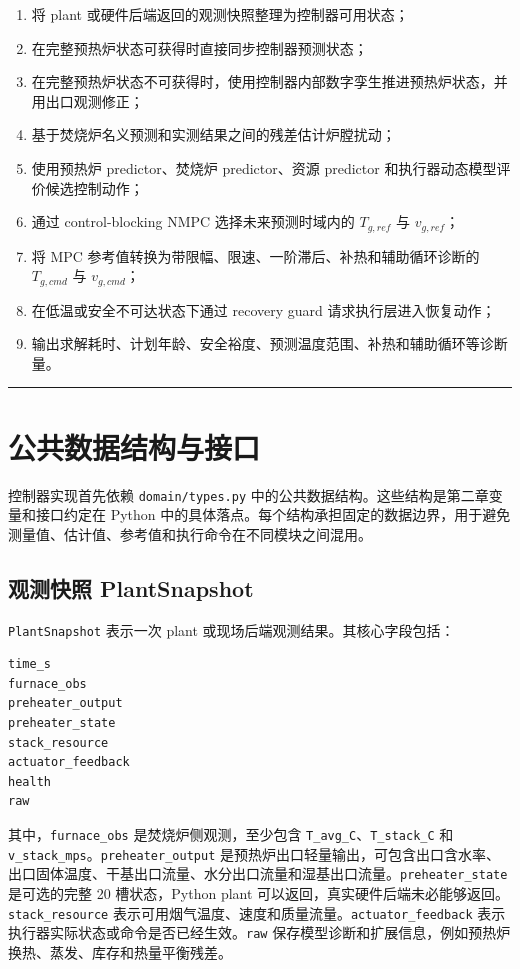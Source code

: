 \documentclass[UTF8,openany,zihao=-4,oneside]{ctexbook}
\providecommand{\tightlist}{\setlength{\itemsep}{0pt}\setlength{\parskip}{0pt}}
\providecommand{\passthrough}[1]{#1}
\newcommand{\manualdivider}{\par\vspace{0.6em}\noindent\textcolor{FGLine}{\rule{\linewidth}{0.7pt}}\vspace{0.6em}\par}
\begin{document}
\begin{enumerate}
\def\labelenumi{\arabic{enumi}.}
\tightlist
\item
  将 plant 或硬件后端返回的观测快照整理为控制器可用状态；
\item
  在完整预热炉状态可获得时直接同步控制器预测状态；
\item
  在完整预热炉状态不可获得时，使用控制器内部数字孪生推进预热炉状态，并用出口观测修正；
\item
  基于焚烧炉名义预测和实测结果之间的残差估计炉膛扰动；
\item
  使用预热炉 predictor、焚烧炉 predictor、资源 predictor 和执行器动态模型评价候选控制动作；
\item
  通过 control-blocking NMPC 选择未来预测时域内的 \(T_{g,ref}\) 与 \(v_{g,ref}\)；
\item
  将 MPC 参考值转换为带限幅、限速、一阶滞后、补热和辅助循环诊断的 \(T_{g,cmd}\) 与 \(v_{g,cmd}\)；
\item
  在低温或安全不可达状态下通过 recovery guard 请求执行层进入恢复动作；
\item
  输出求解耗时、计划年龄、安全裕度、预测温度范围、补热和辅助循环等诊断量。
\end{enumerate}

\manualdivider

\section{公共数据结构与接口}\label{sec:controller-domain-types}

控制器实现首先依赖 \passthrough{\lstinline!domain/types.py!} 中的公共数据结构。这些结构是第二章变量和接口约定在 Python 中的具体落点。每个结构承担固定的数据边界，用于避免测量值、估计值、参考值和执行命令在不同模块之间混用。

\subsection{观测快照 PlantSnapshot}\label{subsec:plant-snapshot}

\passthrough{\lstinline!PlantSnapshot!} 表示一次 plant 或现场后端观测结果。其核心字段包括：

\begin{lstlisting}
time_s
furnace_obs
preheater_output
preheater_state
stack_resource
actuator_feedback
health
raw
\end{lstlisting}

其中，\passthrough{\lstinline!furnace_obs!} 是焚烧炉侧观测，至少包含 \passthrough{\lstinline!T_avg_C!}、\passthrough{\lstinline!T_stack_C!} 和 \passthrough{\lstinline!v_stack_mps!}。\passthrough{\lstinline!preheater_output!} 是预热炉出口轻量输出，可包含出口含水率、出口固体温度、干基出口流量、水分出口流量和湿基出口流量。\passthrough{\lstinline!preheater_state!} 是可选的完整 20 槽状态，Python plant 可以返回，真实硬件后端未必能够返回。\passthrough{\lstinline!stack_resource!} 表示可用烟气温度、速度和质量流量。\passthrough{\lstinline!actuator_feedback!} 表示执行器实际状态或命令是否已经生效。\passthrough{\lstinline!raw!} 保存模型诊断和扩展信息，例如预热炉换热、蒸发、库存和热量平衡残差。
\end{document}
